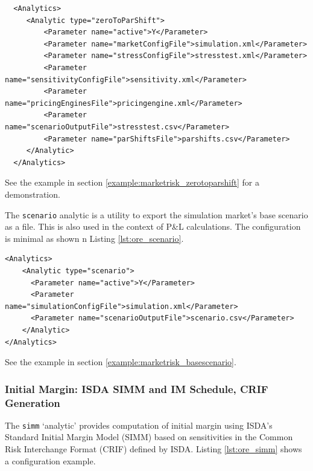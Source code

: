 \begin{listing}[H]
\begin{verbatim}
  <Analytics>
     <Analytic type="zeroToParShift">
         <Parameter name="active">Y</Parameter>
         <Parameter name="marketConfigFile">simulation.xml</Parameter>
         <Parameter name="stressConfigFile">stresstest.xml</Parameter>
         <Parameter name="sensitivityConfigFile">sensitivity.xml</Parameter>
         <Parameter name="pricingEnginesFile">pricingengine.xml</Parameter>
         <Parameter name="scenarioOutputFile">stresstest.csv</Parameter>
         <Parameter name="parShiftsFile">parshifts.csv</Parameter>
     </Analytic>
  </Analytics>
\end{verbatim}
\caption{ORE analytic: Zero to Par Shift}
\label{lst:ore_zerotoparshift}
\end{listing}

See the example in section \ref{example:marketrisk_zerotoparshift} for a demonstration.

\medskip

The {\tt scenario} analytic is a utility to export the simulation market's base scenario as a file.
This is also used in the context of P\&L calculations. The configuration is minimal as shown
n Listing \ref{lst:ore_scenario}.

\begin{listing}[H]
\begin{verbatim}
<Analytics>
    <Analytic type="scenario">
      <Parameter name="active">Y</Parameter>
      <Parameter name="simulationConfigFile">simulation.xml</Parameter>
      <Parameter name="scenarioOutputFile">scenario.csv</Parameter>
    </Analytic>
</Analytics>
\end{verbatim}
\caption{ORE analytic: Scenario}
\label{lst:ore_scenario}
\end{listing}

See the example in section \ref{example:marketrisk_basescenario}.

\subsubsection{Initial Margin: ISDA SIMM and IM Schedule, CRIF Generation}

The {\tt simm} `analytic' provides computation of initial margin using ISDA's Standard Initial Margin Model (SIMM)
based on sensitivities in the Common Risk Interchange Format (CRIF) defined by ISDA. Listing \ref{lst:ore_simm} shows
a configuration example.

